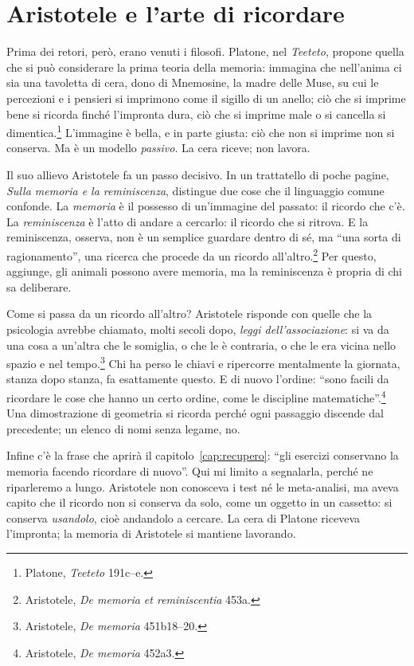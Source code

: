 \section{Aristotele e l'arte di ricordare}

Prima dei retori, però, erano venuti i filosofi. Platone, nel
\emph{Teeteto}, propone quella che si può considerare la prima teoria
della memoria: immagina che nell'anima ci sia una tavoletta di cera,
dono di Mnemosine, la madre delle Muse, su cui le percezioni e i
pensieri si imprimono come il sigillo di un anello; ciò che si imprime
bene si ricorda finché l'impronta dura, ciò che si imprime male o si
cancella si dimentica.\footnote{Platone, \emph{Teeteto} 191c--e.}
L'immagine è bella, e in parte giusta: ciò che non si imprime non si
conserva. Ma è un modello \emph{passivo}. La cera riceve; non lavora.

Il suo allievo Aristotele fa un passo decisivo. In un trattatello di
poche pagine, \emph{Sulla memoria e la reminiscenza}, distingue due
cose che il linguaggio comune confonde. La \emph{memoria} è il possesso
di un'immagine del passato: il ricordo che c'è. La \emph{reminiscenza}
è l'atto di andare a cercarlo: il ricordo che si ritrova. E la
reminiscenza, osserva, non è un semplice guardare dentro di sé, ma
\enquote{una sorta di ragionamento}, una ricerca che procede da un
ricordo all'altro.\footnote{Aristotele, \emph{De memoria et
reminiscentia} 453a.} Per questo, aggiunge, gli animali possono avere
memoria, ma la reminiscenza è propria di chi sa deliberare.

Come si passa da un ricordo all'altro? Aristotele risponde con quelle
che la psicologia avrebbe chiamato, molti secoli dopo, \emph{leggi
dell'associazione}: si va da una cosa a un'altra che le somiglia, o
che le è contraria, o che le era vicina nello spazio e nel
tempo.\footnote{Aristotele, \emph{De memoria} 451b18--20.} Chi ha
perso le chiavi e ripercorre mentalmente la giornata, stanza dopo
stanza, fa esattamente questo. E di nuovo l'ordine: \enquote{sono facili
da ricordare le cose che hanno un certo ordine, come le discipline
matematiche}.\footnote{Aristotele, \emph{De memoria} 452a3.} Una
dimostrazione di geometria si ricorda perché ogni passaggio discende dal
precedente; un elenco di nomi senza legame, no.

Infine c'è la frase che aprirà il
capitolo~\ref{cap:recupero}: \enquote{gli esercizi conservano la
memoria facendo ricordare di nuovo}. Qui mi limito a segnalarla,
perché ne riparleremo a lungo. Aristotele non conosceva i test né le
meta-analisi, ma aveva capito che il ricordo non si conserva da solo,
come un oggetto in un cassetto: si conserva \emph{usandolo}, cioè
andandolo a cercare. La cera di Platone riceveva l'impronta; la memoria
di Aristotele si mantiene lavorando.

